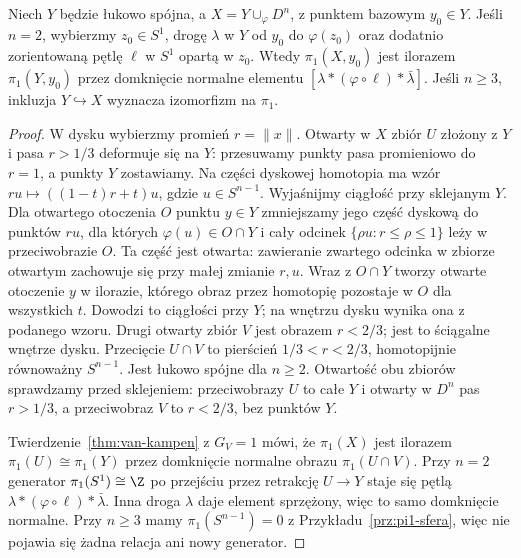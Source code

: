 \begin{twierdzenie}
\label{thm:pi1-dolaczenie-komorki}
Niech $Y$ będzie łukowo spójna,
a $X=Y\cup_\varphi D^n$, z punktem bazowym $y_0\in Y$.
Jeśli $n=2$, wybierzmy $z_0\in S^1$, drogę
$\lambda$ w $Y$ od $y_0$ do $\varphi(z_0)$ oraz
dodatnio zorientowaną pętlę $\ell$ w $S^1$ opartą w $z_0$.
Wtedy $\pi_1(X,y_0)$ jest ilorazem $\pi_1(Y,y_0)$
przez domknięcie normalne elementu
$[\lambda*(\varphi\circ\ell)*\bar\lambda]$.
Jeśli $n\geq3$, inkluzja
$Y\hookrightarrow X$ wyznacza izomorfizm na $\pi_1$.
\end{twierdzenie}
\begin{proof}
W dysku wybierzmy promień $r=\|x\|$.
Otwarty w $X$ zbiór $U$ złożony
z $Y$ i pasa $r>1/3$ deformuje
się na $Y$: przesuwamy punkty
pasa promieniowo do $r=1$,
a punkty $Y$ zostawiamy. Na części dyskowej homotopia ma wzór
$ru\mapsto((1-t)r+t)u$, gdzie $u\in S^{n-1}$.
Wyjaśnijmy ciągłość przy sklejanym $Y$. Dla otwartego otoczenia
$O$ punktu $y\in Y$ zmniejszamy jego część dyskową do punktów $ru$,
dla których $\varphi(u)\in O\cap Y$ i cały odcinek
$\{\rho u:r\leq\rho\leq1\}$ leży w przeciwobrazie $O$.
Ta część jest otwarta: zawieranie zwartego odcinka w zbiorze
otwartym zachowuje się przy małej zmianie $r,u$.
Wraz z $O\cap Y$ tworzy otwarte otoczenie $y$ w ilorazie,
którego obraz przez homotopię pozostaje w $O$ dla wszystkich $t$.
Dowodzi to ciągłości przy $Y$; na wnętrzu dysku wynika ona z podanego wzoru.
Drugi otwarty zbiór $V$ jest
obrazem $r<2/3$; jest to
ściągalne wnętrze dysku.
Przecięcie $U\cap V$ to pierścień
$1/3<r<2/3$, homotopijnie
równoważny $S^{n-1}$.
Jest łukowo spójne dla $n\geq2$.
Otwartość obu zbiorów sprawdzamy przed sklejeniem:
przeciwobrazy $U$ to całe $Y$ i otwarty w $D^n$ pas $r>1/3$,
a przeciwobraz $V$ to $r<2/3$, bez punktów $Y$.

Twierdzenie~\ref{thm:van-kampen}
z $G_V=1$ mówi, że $\pi_1(X)$
jest ilorazem $\pi_1(U)\cong\pi_1(Y)$
przez domknięcie normalne obrazu
$\pi_1(U\cap V)$. Przy $n=2$
generator $\pi_1(S^1)\cong\Z$
po przejściu przez retrakcję
$U\to Y$ staje się pętlą
$\lambda*(\varphi\circ\ell)*\bar\lambda$.
Inna droga $\lambda$ daje element sprzężony, więc
to samo domknięcie normalne.
Przy $n\geq3$ mamy
$\pi_1(S^{n-1})=0$ z
Przykładu~\ref{prz:pi1-sfera},
więc nie pojawia się żadna
relacja ani nowy generator.
\end{proof}

